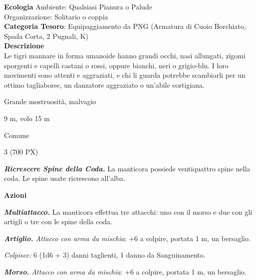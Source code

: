 \begin{multicols}{2}
{\textbf{Ecologia}
Ambiente: Qualsiasi Pianura o Palude\\
Organizzazione: Solitario o coppia\\
\textbf{Categoria Tesoro}: Equipaggiamento da PNG (Armatura di Cuoio Borchiato, Spada Corta, 2 Pugnali, K)\\
\textbf{Descrizione}\\
Le tigri mannare in forma umanoide hanno grandi occhi, nasi allungati, zigomi sporgenti e capelli castani o rossi, oppure bianchi, neri o grigio-blu. I loro movimenti sono attenti e aggraziati, e chi li guarda potrebbe scambiarli per un ottimo tagliaborse, un danzatore aggraziato o un'abile cortigiana.

\begin{description}[noitemsep, topsep=0pt, parsep=0pt, partopsep=0pt, itemsep=1pt, leftmargin=2.35cm,  labelwidth=2.2cm, itemindent=0cm, listparindent=0pt] %
\setlength{\baselineskip}{10pt}
\item[\textbf{Taglia/Tipo}] Grande mostruosità, malvagio
\item[\textbf{Caratt.}] 
\item[\textbf{Punti Ferita}] 
\item[\textbf{Movimento}] 9 m, volo 15 m
\item[\textbf{Tiri Salvez.}] 
\item[\textbf{Sensi}] 
\item[\textbf{Linguaggi}] Comune
\item[\textbf{Sfida}] 3 (700 PX)
\end{description}
\smallskip

\emph{\textbf{Ricrescere Spine della Coda.}} La manticora possiede ventiquattro spine nella coda. Le spine usate ricrescono all'alba.

\textbf{Azioni}

\emph{\textbf{Multiattacco.}} La manticora effettua tre attacchi: uno con il morso e due con gli artigli o tre con le spine della coda.

\emph{\textbf{Artiglio.} Attacco con arma da mischia}: +6 a colpire, portata 1 m, un bersaglio.

\emph{Colpisce:} 6 (1d6 + 3) danni taglienti, 1 danno da Sanguinamento.

\emph{\textbf{Morso.} Attacco con arma da mischia}: +6 a colpire, portata 1 m, un bersaglio.

}
\end{multicols}
